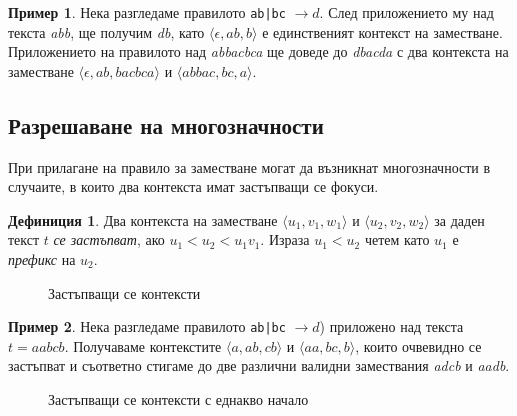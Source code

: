 \documentclass[12pt, oneside]{article}
\theoremstyle{definition}
\newtheorem{definition}{Дефиниция}[section]
\newtheorem{example}{Пример}[section]
\begin{document}
\begin{example}
	Нека разгледаме правилото \verb/ab|bc/ \( \to d \). След приложението му над текста \emph{abb}, ще получим \emph{db}, като \( \langle \epsilon, ab, b \rangle \) е единственият контекст на заместване. Приложението на правилото над \emph{abbacbca} ще доведе до \emph{dbacda} с два контекста на заместване \( \langle \epsilon, ab, bacbca \rangle \) и \( \langle abbac, bc, a \rangle \).
\end{example}

\subsection{Разрешаване на многозначности}

При прилагане на правило за заместване могат да възникнат многозначности в случаите, в които два контекста имат застъпващи се фокуси.

\begin{definition}
	Два контекста на заместване \( \langle u_1,v_1,w_1 \rangle \) и \( \langle u_2,v_2,w_2 \rangle \) за даден текст \( t \) \emph{се застъпват}, ако \( u_1 < u_2 < u_1v_1 \). Израза \( u_1 < u_2 \) четем като \( u_1 \) е \emph{префикс} на \( u_2 \).
\end{definition}

\begin{figure}[!htb]
	\centering
	
	\caption{Застъпващи се контексти}
\end{figure}

\begin{example}
	Нека разгледаме правилото \verb/ab|bc/ \( \to d \)) приложено над текста \( t = aabcb \). Получаваме контекстите \( \langle a, ab, cb \rangle \) и \( \langle aa, bc, b \rangle \), които очвевидно се застъпват и съответно стигаме до две различни валидни замествания \emph{adcb} и \emph{aadb}.
\end{example}

\begin{figure}[!htb]
	\centering
	
	\caption{Застъпващи се контексти с еднакво начало}
\end{figure}
\end{document}
